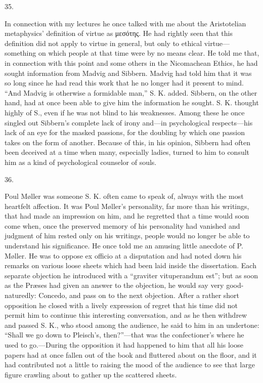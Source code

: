 \documentclass[12pt,a4paper,openany]{book}
\newcommand{\secnum}[1]{\par\begin{center}#1\end{center}\par\nobreak}
\newcommand{\opage}[1]{\marginnote{\footnotesize\textit{[#1]}}}
\begin{document}
\secnum{35.}

In connection with my lectures he once talked
with me about the Aristotelian metaphysics' definition
of virtue as μεσότης. He had rightly seen that this
definition did not apply to virtue in general, but
\opage{362}only to ethical virtue---something on which people at that time were by no means
clear. He told me that, in connection
with this point and some others in the Nicomachean
Ethics, he had sought information from Madvig and Sibbern.
Madvig had told him that it was so long since
he had read this work that he no longer had it
present to mind. ``And Madvig is otherwise a formidable man,'' S. K.
added. Sibbern, on the other hand, had at once been able to give him the
information he sought. S. K. thought highly of S., even if
he was not blind to his weaknesses. Among
these he once singled out Sibbern's complete
lack of irony and---in psychological respects---his
lack of an eye for the masked passions,
for the doubling by which one passion
takes on the form of another. Because of this, in his opinion,
Sibbern had often been deceived at a time when many, especially
ladies, turned to him to consult him as
a kind of psychological counselor of souls.

\secnum{36.}

Poul Møller was someone S. K. often came to speak of, always
with the most heartfelt affection. It was Poul Møller's
personality, far more than his writings, that had
made an impression on him, and he regretted that a time would
soon come when, once the preserved memory
of his personality had vanished and judgment
of him rested only on his writings, people would no longer
be able to understand his significance. He once told me
an amusing little anecdote of P. Møller. He was to
oppose ex officio at a disputation and had noted down
his remarks on various loose sheets which had been
laid inside the dissertation. Each separate objection he
introduced with a ``graviter vituperandum est''; but as soon as
the Præses had given an answer to the objection, he would say
very good-naturedly: Concedo, and pass on to the next
objection. After a rather short opposition he closed
\opage{363}with a lively expression of regret that his time did not
permit him to continue this interesting conversation, and
as he then withdrew and passed S. K., who stood
among the audience, he said to him in an undertone: ``Shall we
go down to Pleisch's, then?''---that was the confectioner's where
he used to go.---During the opposition it had happened
to him that all his loose papers had at once fallen
out of the book and fluttered about on the floor, and it
had contributed not a little to raising the mood of the audience
to see that large figure crawling about to
gather up the scattered sheets.
\end{document}
